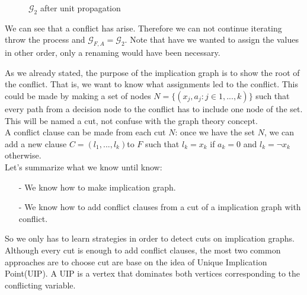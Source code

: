 \begin{example}
\begin{figure}[H]
  \centering
  \caption{$\mathcal{G}_2$ after unit propagation}
\end{figure} 
We can see that a conflict has arise. Therefore we can not continue iterating throw the process and $\mathcal{G}_{F,A} = \mathcal{G}_2$. Note that have we wanted to assign the values in other order, only a renaming would have been necessary. 
\end{example} 
As we already stated, the purpose of the implication graph is to show the root of the conflict. That is, we want to know what assignments led to the conflict. This could be made by making a set of nodes $N=\{(x_j,a_j: j\in 1,...,k)\}$ such that every path from a decision node to the conflict has to include one node of the set. This will be named a cut, not confuse with the graph theory concept.\\


A conflict clause can be made from each cut $N$: once we have the set $N$, we can add a new clause $C = (l_1,...,l_k)$to $F$ such that $l_k = x_k$ if $a_k = 0$ and $l_k=\neg x_k$ otherwise.\\

Let's summarize what we know until know:
\begin{itemize}
\item[-] We know how to make implication graph.
\item[-] We know how to add conflict clauses from a cut of a implication graph with conflict.  
\end{itemize}

So we only has to learn strategies in order to detect cuts on implication graphs. Although every cut is enough to add conflict clauses, the most two common approaches are to choose cut are base on the idea of Unique Implication Point(UIP).  A UIP   is   a   vertex    that   dominates   both   vertices   corresponding   to   the   conflicting   variable. 

